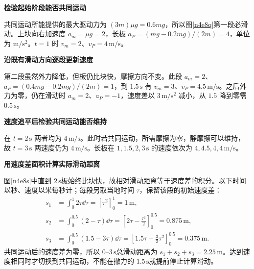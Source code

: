 \begin{solution}\textbf{检验起始阶段能否共同运动}\par\nobreak
共同运动所能提供的最大驱动力为 $(3m)\mu g=0.6mg$，所以图\ref{n4e8q}第一段必滑动。上块向右加速度 $a_m=\mu g=2$，长板 $a_P=(mg-0.2mg)/(2m)=4$，单位为 $\mathrm{m/s^2}$。$t=1$ 时 $v_m=2$、$v_P=4\,\mathrm{m/s}$。



\par\medskip{}\noindent\textbf{沿既有滑动方向逐段更新速度}\par\nobreak
第二段虽然外力降低，但板仍比块快，摩擦方向不变。此段 $a_m=2$、$a_P=(0.4mg-0.2mg)/(2m)=1$，到 $1.5\,\mathrm s$ 有 $v_m=3$、$v_P=4.5\,\mathrm{m/s}$。之后外力为零，仍在滑动时 $a_m=2$、$a_P=-1$，速度差以 $3\,\mathrm{m/s^2}$ 减小，从 $1.5$ 降到零需 $0.5\,\mathrm s$。



\par\medskip{}\noindent\textbf{速度追平后检验共同运动能否维持}\par\nobreak
在 $t=2\,\mathrm s$ 两者均为 $4\,\mathrm{m/s}$。此时若共同运动，所需摩擦为零，静摩擦可以维持，故 $t=3\,\mathrm s$ 两速度仍为 $4\,\mathrm{m/s}$。长板在 $1,1.5,2,3\,\mathrm s$ 的速度依次为 $4,4.5,4,4\,\mathrm{m/s}$。



\par\medskip{}\noindent\textbf{用速度差面积计算实际滑动距离}\par\nobreak
图\ref{n4e8s}中直到 $2\,\mathrm s$板始终比块快，故相对滑动距离等于速度差的积分。以下时间以秒、速度以米每秒计；每段另取当地时间 $\tau$，保留该段的初始速度差：
\begin{align*}
 s_1&=\int_0^1 2\tau\dd\tau=[\tau^2]_0^1=1\,\mathrm m,\\
 s_2&=\int_0^{0.5}(2-\tau)\dd\tau
 =\left[2\tau-\frac{\tau^2}{2}\right]_0^{0.5}
 =0.875\,\mathrm m,\\
 s_3&=\int_0^{0.5}(1.5-3\tau)\dd\tau
 =\left[1.5\tau-\frac32\tau^2\right]_0^{0.5}
 =0.375\,\mathrm m.
\end{align*}
共同运动后的速度差为零，所以 $0$--$3\,\mathrm s$总滑动距离为 $s_1+s_2+s_3=2.25\,\mathrm m$。达到速度相同时才切换到共同运动，不能在撤力的 $1.5\,\mathrm s$就提前停止计算滑动。
\end{solution}


